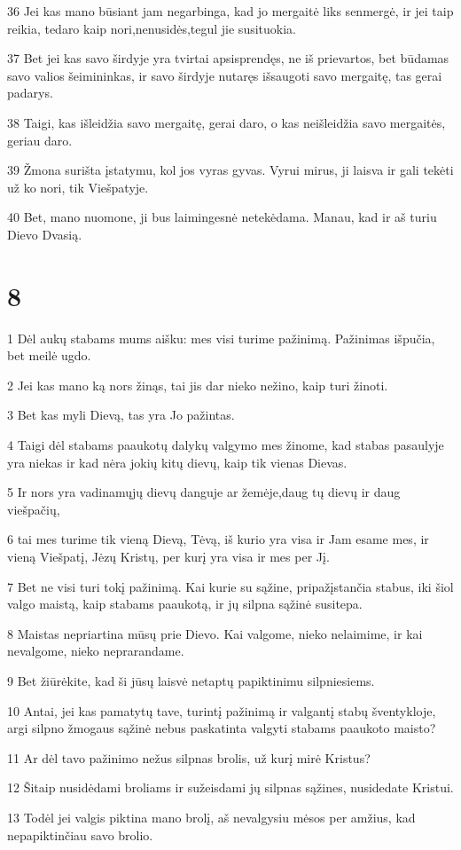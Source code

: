 \par 36 Jei kas mano būsiant jam negarbinga, kad jo mergaitė liks senmergė, ir jei taip reikia, tedaro kaip nori,­nenusidės,­tegul jie susituokia. 
\par 37 Bet jei kas savo širdyje yra tvirtai apsisprendęs, ne iš prievartos, bet būdamas savo valios šeimininkas, ir savo širdyje nutaręs išsaugoti savo mergaitę, tas gerai padarys. 
\par 38 Taigi, kas išleidžia savo mergaitę, gerai daro, o kas neišleidžia savo mergaitės, geriau daro. 
\par 39 Žmona surišta įstatymu, kol jos vyras gyvas. Vyrui mirus, ji laisva ir gali tekėti už ko nori, tik Viešpatyje. 
\par 40 Bet, mano nuomone, ji bus laimingesnė netekėdama. Manau, kad ir aš turiu Dievo Dvasią.


\chapter{8}


\par 1 Dėl aukų stabams mums aišku: mes visi turime pažinimą. Pažinimas išpučia, bet meilė ugdo. 
\par 2 Jei kas mano ką nors žinąs, tai jis dar nieko nežino, kaip turi žinoti. 
\par 3 Bet kas myli Dievą, tas yra Jo pažintas. 
\par 4 Taigi dėl stabams paaukotų dalykų valgymo mes žinome, kad stabas pasaulyje yra niekas ir kad nėra jokių kitų dievų, kaip tik vienas Dievas. 
\par 5 Ir nors yra vadinamųjų dievų danguje ar žemėje,­daug tų dievų ir daug viešpačių,­ 
\par 6 tai mes turime tik vieną Dievą, Tėvą, iš kurio yra visa ir Jam esame mes, ir vieną Viešpatį, Jėzų Kristų, per kurį yra visa ir mes per Jį. 
\par 7 Bet ne visi turi tokį pažinimą. Kai kurie su sąžine, pripažįstančia stabus, iki šiol valgo maistą, kaip stabams paaukotą, ir jų silpna sąžinė susitepa. 
\par 8 Maistas nepriartina mūsų prie Dievo. Kai valgome, nieko nelaimime, ir kai nevalgome, nieko neprarandame. 
\par 9 Bet žiūrėkite, kad ši jūsų laisvė netaptų papiktinimu silpniesiems. 
\par 10 Antai, jei kas pamatytų tave, turintį pažinimą ir valgantį stabų šventykloje, argi silpno žmogaus sąžinė nebus paskatinta valgyti stabams paaukoto maisto? 
\par 11 Ar dėl tavo pažinimo nežus silpnas brolis, už kurį mirė Kristus? 
\par 12 Šitaip nusidėdami broliams ir sužeisdami jų silpnas sąžines, nusidedate Kristui. 
\par 13 Todėl jei valgis piktina mano brolį, aš nevalgysiu mėsos per amžius, kad nepapiktinčiau savo brolio.


